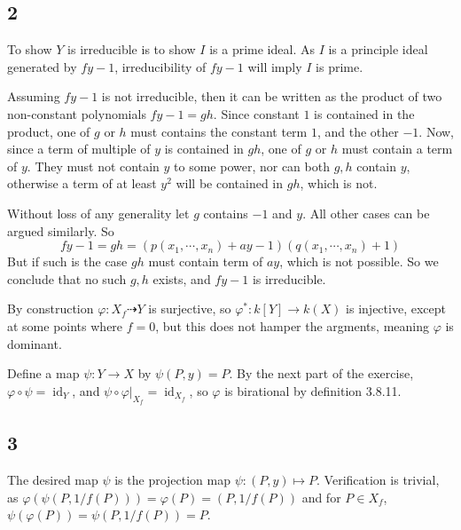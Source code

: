 \documentclass{article}
\theoremstyle{definition}
\theoremstyle{definition}
\theoremstyle{remark}
\begin{document}
\subsection*{2}

To show $Y$ is irreducible is to show $I$ is a prime ideal. 
As $I$ is a principle ideal generated by $fy - 1$, irreducibility of $fy - 1$ will imply $I$ is prime.

Assuming $fy - 1$ is not irreducible, then it can be written as the product of two non-constant polynomials $fy - 1 = gh$. 
Since constant $1$ is contained in the product, one of $g$ or $h$ must contains the constant term $1$, and the other $-1$. 
Now, since a term of multiple of $y$ is contained in $gh$, one of $g$ or $h$ must contain a term of $y$. 
They must not contain $y$ to some power, nor can both $g,h$ contain $y$, otherwise a term of at least $y^2$ will be contained in $gh$, which is not.

Without loss of any generality let $g$ contains $-1$ and $y$. 
All other cases can be argued similarly.
So
$$
	fy - 1 = gh = ( p(x_1, \cdots, x_n) + ay - 1) (q(x_1,\cdots, x_n) + 1)
$$
But if such is the case $gh$ must contain term of $ay$, which is not possible. 
So we conclude that no such $g,h$ exists, and $fy - 1$ is irreducible.

By construction $\varphi: X_f \dashrightarrow Y$ is surjective, so $\varphi^*: k[Y] \rightarrow k(X)$ is injective, except at some points where $f = 0$, but this does not hamper the argments, meaning $\varphi$ is dominant.

Define a map $\psi: Y \rightarrow X$ by $\psi(P, y) = P$. 
By the next part of the exercise, $\varphi \circ \psi = \operatorname{id}_Y$, and $\psi \circ \varphi|_{X_f} = \operatorname{id}_{X_f}$, so $\varphi$ is birational by definition 3.8.11.

\subsection*{3}
The desired map $\psi$ is the projection map $\psi: (P, y) \mapsto P$.
Verification is trivial, as $\varphi(\psi(P, 1/f(P))) = \varphi(P) = (P, 1/f(P))$ and for $P \in X_f$, $\psi(\varphi(P)) = \psi(P, 1/f(P)) = P$.
\end{document}

